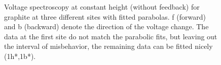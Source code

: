 \documentclass[a4paper]{scrartcl}
\numberwithin{equation}{section}
\numberwithin{figure}{section}
\numberwithin{table}{section}
\begin{document}
\begin{figure}[!h]
\hfill
{}
\caption{\small Voltage spectroscopy at constant height (without feedback) for graphite at three different sites with fitted parabolas. f (forward) and b (backward) denote the direction of the voltage change. The data at the first site do not match the parabolic fits, but leaving out the interval of misbehavior, the remaining data can be fitted nicely (1h*,1b*).}
\label{fig:parabolasgraph}
\end{figure}


\FloatBarrier
\end{document}
